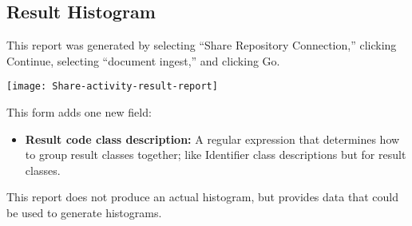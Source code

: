 \begin{changemargin}{1.5in}{0in}
\subsection{Result Histogram}

This report was generated by selecting ``Share Repository Connection,''
clicking Continue, selecting ``document ingest,'' and clicking Go.

\texttt{[image: Share-activity-result-report]}

This form adds one new field:

\begin{itemize}

\item \textbf{Result code class description:} A regular expression that
determines how to group result classes together; like Identifier class
descriptions but for result classes.

\end{itemize}

This report does not produce an actual histogram, but provides data that
could be used to generate histograms.  


\end{changemargin}
